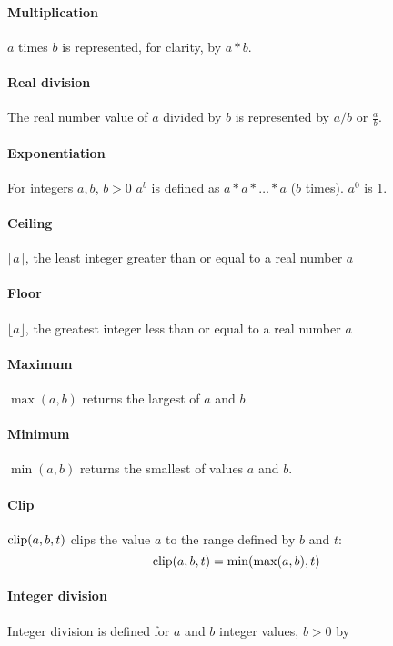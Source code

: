 \paragraph*{Multiplication} $a$ times $b$ is represented, for clarity, by $a*b$.

\paragraph*{Real division} The real number value of $a$ divided by $b$ is represented by $a/b$ or $\frac{a}{b}$.

\paragraph*{Exponentiation} For integers $a, b$, $b>0$ $a^b$ is defined as $a*a*\hdots *a$ ($b$ times). $a^0$ is 1.

\paragraph*{Ceiling} $\lceil a \rceil$, the least integer greater than or equal to a real number $a$

\paragraph*{Floor} $\lfloor a \rfloor$, the greatest integer less than or equal to a real number $a$

\paragraph*{Maximum} $\max(a,b)$ returns the largest of $a$ and $b$.

\paragraph*{Minimum} $\min(a,b)$ returns the smallest of values $a$ and $b$.

\paragraph*{Clip} $\operatorname{clip}(a,b,t)$ clips the value $a$ to the range defined by $b$ and $t$:
\[\operatorname{clip}(a,b,t)=\min(\max(a,b),t)\]

\paragraph*{Integer division} Integer division is defined for $a$ and $b$ integer values, $b>0$ by

